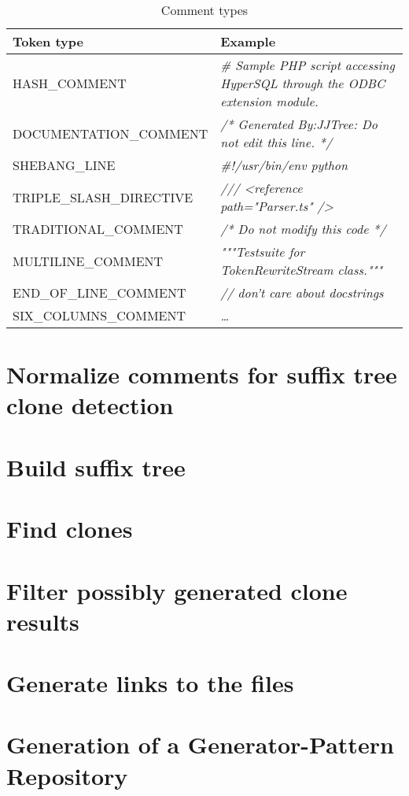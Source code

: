 \begin{table}[H]
	\caption{Comment types}
	\label{table_commentTypes}
	\begin{tabularx}{\textwidth}{l|L}
		\textbf{Token type} & \textbf{Example} \\
		\hline
		HASH\_COMMENT & \textit{\# Sample PHP script accessing HyperSQL through the ODBC extension module.}\\ 
		DOCUMENTATION\_COMMENT & \textit{/* Generated By:JJTree: Do not edit this line. */} \\ 
		SHEBANG\_LINE & \textit{\#!/usr/bin/env python } \\ 
		TRIPLE\_SLASH\_DIRECTIVE & \textit{/// <reference path="Parser.ts" />} \\ 
		TRADITIONAL\_COMMENT & \textit{/* Do not modify this code */} \\ 
		MULTILINE\_COMMENT & \textit{"""Testsuite for TokenRewriteStream class."""} \\ 
		END\_OF\_LINE\_COMMENT & \textit{// don't care about docstrings} \\ 
		SIX\_COLUMNS\_COMMENT & \textit{\dots} \\ 
	\end{tabularx} 
\end{table}


\section{Normalize comments for suffix tree clone detection}



\section{Build suffix tree}
\section{Find clones}
\section{Filter possibly generated clone results}
\section{Generate links to the files}
\section{Generation of a Generator-Pattern Repository}